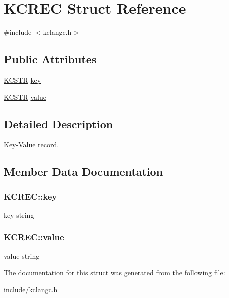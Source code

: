 \hypertarget{structKCREC}{\section{\-K\-C\-R\-E\-C \-Struct \-Reference}
\label{structKCREC}
}


{\ttfamily \#include $<$kclangc.\-h$>$}

\subsection*{\-Public \-Attributes}
\begin{DoxyCompactItemize}
\item 
\hyperlink{structKCSTR}{\-K\-C\-S\-T\-R} \hyperlink{structKCREC_a0a1dd7a77ca0ae233e3a0f54c5f66139}{key}
\item 
\hyperlink{structKCSTR}{\-K\-C\-S\-T\-R} \hyperlink{structKCREC_a8dbf8ff1432c43c631f077529f1846bf}{value}
\end{DoxyCompactItemize}


\subsection{\-Detailed \-Description}
\-Key-\/\-Value record. 

\subsection{\-Member \-Data \-Documentation}
\hypertarget{structKCREC_a0a1dd7a77ca0ae233e3a0f54c5f66139}{
\subsubsection[{key}]{ {\bf \-K\-C\-R\-E\-C\-::key}}}\label{structKCREC_a0a1dd7a77ca0ae233e3a0f54c5f66139}
key string \hypertarget{structKCREC_a8dbf8ff1432c43c631f077529f1846bf}{
\subsubsection[{value}]{ {\bf \-K\-C\-R\-E\-C\-::value}}}\label{structKCREC_a8dbf8ff1432c43c631f077529f1846bf}
value string 

\-The documentation for this struct was generated from the following file\-:\begin{DoxyCompactItemize}
\item 
include/kclangc.\-h\end{DoxyCompactItemize}
